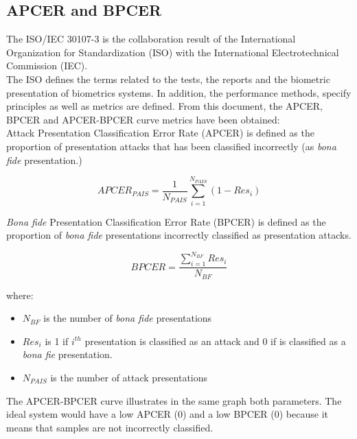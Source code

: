 \subsection{APCER and BPCER}
The ISO/IEC 30107-3 \cite{ISO} is the collaboration result of  the International Organization for Standardization (ISO) with the International Electrotechnical Commission (IEC).\\

The ISO defines the terms related to the tests, the reports and the biometric presentation of biometrics systems. In addition, the performance methods, specify principles as well as metrics are defined. From this document, the APCER, BPCER and APCER-BPCER curve metrics have been obtained:\\

Attack Presentation Classification Error Rate (APCER) is defined as the proportion of presentation attacks that has been classified incorrectly (as \textit{bona fide} presentation.)

\begin{equation}
  APCER_{PAIS} = \frac{1}{N_{PAIS}}\sum_{i=1}^{N_{PAIS}}(1 - Res_{i})
\end{equation}

\textit{Bona fide} Presentation Classification Error Rate (BPCER) is defined as the proportion of \textit{bona fide} presentations  incorrectly classified as presentation attacks.

\begin{equation}
  BPCER = \frac{\sum_{i=1}^{N_{BF}}Res_{i}}{N_{BF}}
\end{equation}

where: \begin{itemize}
\item $N_{BF}$ is the number of \textit{bona fide} presentations
\item $Res_{i}$ is 1 if $i^{th}$ presentation is classified as an attack and 0 if is classified as a \textit{bona fie} presentation.
\item $N_{PAIS}$ is the number of attack presentations
\end{itemize}

The APCER-BPCER curve illustrates in the same graph both parameters. The ideal system would have a low APCER (0) and a low BPCER (0) because it means that samples are not incorrectly classified.
